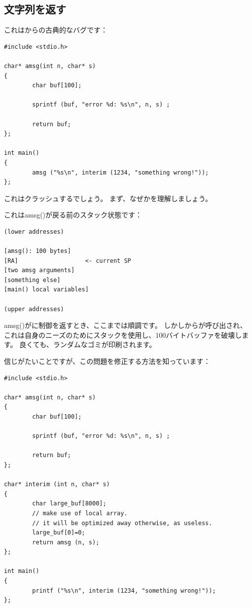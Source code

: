 \subsection{文字列を返す}

これは\RobPikePractice{}からの古典的なバグです：

\begin{lstlisting}[style=customc]
#include <stdio.h>

char* amsg(int n, char* s)
{
        char buf[100];

        sprintf (buf, "error %d: %s\n", n, s) ;

        return buf;
};

int main()
{
        amsg ("%s\n", interim (1234, "something wrong!"));
};
\end{lstlisting}

これはクラッシュするでしょう。
まず、なぜかを理解しましょう。

これはamsg()が戻る前のスタック状態です：

\begin{lstlisting}
(lower addresses)

[amsg(): 100 bytes]
[RA]                   <- current SP
[two amsg arguments]
[something else]
[main() local variables]

(upper addresses)
\end{lstlisting}

amsg()が\main{}に制御を返すとき、ここまでは順調です。
しかし\main{}から\printf{}が呼び出され、これは自身のニーズのためにスタックを使用し、100バイトバッファを破壊します。
良くても、ランダムなゴミが印刷されます。

信じがたいことですが、この問題を修正する方法を知っています：

\begin{lstlisting}[style=customc]
#include <stdio.h>

char* amsg(int n, char* s)
{
        char buf[100];

        sprintf (buf, "error %d: %s\n", n, s) ;

        return buf;
};

char* interim (int n, char* s)
{
        char large_buf[8000];
        // make use of local array.
        // it will be optimized away otherwise, as useless.
        large_buf[0]=0;
        return amsg (n, s);
};

int main()
{
        printf ("%s\n", interim (1234, "something wrong!"));
};
\end{lstlisting}


